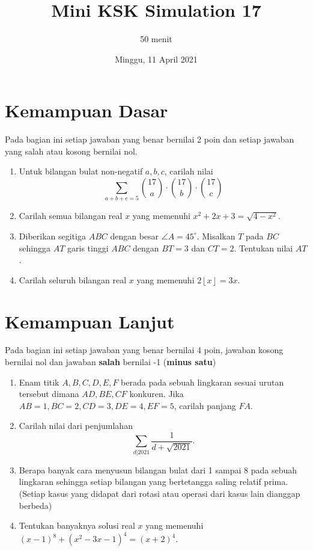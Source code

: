 \documentclass{article}
\title{Mini KSK Simulation 17}
\author{50 menit}
\date{Minggu, 11 April 2021}
\begin{document}
	\maketitle
	
	\section{Kemampuan Dasar}
	Pada bagian ini setiap jawaban yang benar bernilai 2 poin dan setiap jawaban yang salah
	atau kosong bernilai nol.
	\begin{enumerate}
		\item Untuk bilangan bulat non-negatif $a,b,c$, carilah nilai $$ \sum_{a+b+c=5} \binom {17} {a} \cdot \binom {17} {b} \cdot \binom {17} {c}$$
		
		\item Carilah semua bilangan real $x$ yang memenuhi $x^2+2x+3=\sqrt{4-x^2}$.
		
		\item Diberikan segitiga $ABC$ dengan besar $\angle A = 45^\circ$. Misalkan $T$ pada $BC$ sehingga $AT$ garis tinggi $ABC$ dengan $BT=3$ dan $CT=2$. Tentukan nilai $AT$.
		
		\item Carilah seluruh bilangan real $x$ yang memenuhi $2\left\lfloor x \right \rfloor = 3x$.
	\end{enumerate}

\section{Kemampuan Lanjut}
Pada bagian ini setiap jawaban yang benar bernilai 4 poin, jawaban kosong bernilai nol
dan jawaban \textbf{salah} bernilai -1 (\textbf{minus satu})

\begin{enumerate}[resume]
		\item Enam titik $A,B,C,D,E,F$ berada pada sebuah lingkaran sesuai urutan tersebut dimana $AD,BE,CF$ konkuren. Jika $AB=1, BC=2, CD= 3, DE=4, EF=5$, carilah panjang $FA$. 
		
		\item Carilah nilai dari penjumlahan $$\sum_{d|2021} \frac{1}{d+\sqrt{2021}}.$$
		
		\item Berapa banyak cara menyusun bilangan bulat dari 1 sampai 8 pada sebuah lingkaran sehingga setiap bilangan yang bertetangga saling relatif prima. (Setiap kasus yang didapat dari rotasi atau operasi dari kasus lain dianggap berbeda)
		
		\item Tentukan banyaknya solusi real $x$ yang memenuhi $(x-1)^8+(x^2-3x-1)^4=(x+2)^4.$
\end{enumerate}
\end{document}
